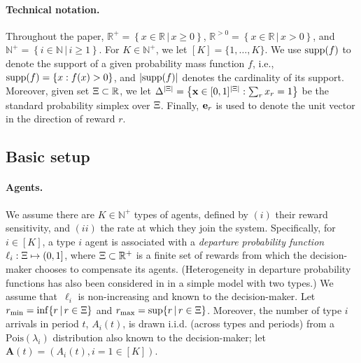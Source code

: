 \documentclass[12pt]{article}
\begin{document}
\paragraph{Technical notation.} Throughout the paper, $\mathbb{R}^+ = \left\{x \in \mathbb{R} \, | \, x \geq 0\right\}$, $\mathbb{R}^{> 0} = \left\{x \in \mathbb{R} \, | \, x > 0\right\}$, and $\mathbb{N}^+ = \left\{i \in \mathbb{N} \, | \, i \geq 1\right\}$. For $K  \in \mathbb{N}^+$, we let $[K] = \{1,\ldots,K\}$. We use $\text{supp}(f)$ to denote the support of a given probability mass function $f$, i.e., $\text{supp}(f) = \left\{x : f(x) > 0\right\}$, and $|\text{supp}(f)|$ denotes the cardinality of its support. Moreover, given set $\Xi \subset \mathbb{R}$, we let {$\Delta^{|\Xi|}=\left\{\mathbf{x}\in[0,1]^{|\Xi|}: \sum_r x_r=1\right\}$} be the standard probability simplex over $\Xi$.  Finally, $\mathbf{e}_r$ is used to denote the unit vector in the direction of reward $r$.

\subsection{Basic setup}

\paragraph{Agents.}
We assume there are $K \in \mathbb{N}^+$ types of agents, defined by $(i)$ their reward sensitivity, and $(ii)$ the rate at which they join the system. Specifically, for $i \in [K]$, a type $i$ agent is associated with a {\it departure probability function} $\ell_i: \Xi \mapsto (0,1]$, where $\Xi \subset \mathbb{R}^+$ is a finite set of rewards from which the decision-maker chooses to compensate its agents. ({{Heterogeneity in departure probability functions has also been considered in \cite{ovchinnikov2014balancing} in a simple model with two types.}}) We assume that~$\ell_i$ is non-increasing and known to the decision-maker. Let $r_{\min} = \inf\{r \, | \, r \in \Xi\}$ and $r_{\max} = \sup\{r \, | \, r \in \Xi\}$. Moreover, the number of type $i$ arrivals in period $t$, $A_i(t)$, is drawn i.i.d. (across types and periods) from a $\text{Pois}(\lambda_i)$ distribution also known to the decision-maker; let~$\mathbf{A}(t) = \left(A_i(t), i = 1 \in [K]\right)$.
\end{document}
